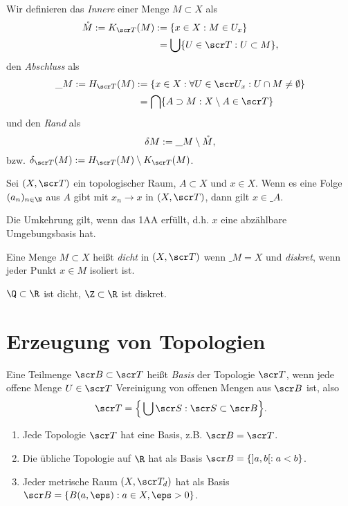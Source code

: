 \begin{df}
	Wir definieren das \emph{Innere} einer Menge $M \subset X$ als
	\begin{align*}
		\mathring M
		:= K_{\scr T}(M)
		&:= \{ x \in X : M \in U_x \} \\
		&\;= \bigcup \{ U \in \scr T : U \subset M \},
	\end{align*}
	den \emph{Abschluss} als
	\begin{align*}
		\_{M}
		:= H_{\scr T}(M)
		&:= \{ x \in X : \forall U \in \scr U_x : U \cap M \neq \emptyset \} \\
		&\;=  \bigcap \{ A \supset M : X \setminus A \in \scr T \}
	\end{align*}
	und den \emph{Rand} als
	\[
		\delta M
		:= \_ M \setminus \mathring M,
	\]
	bzw. $\delta_{\scr T}(M) := H_{\scr T}(M) \setminus K_{\scr T}(M)$.
\end{df}

\begin{st}
	Sei $(X, \scr T)$ ein topologischer Raum, $A \subset X$ und $x \in X$.
	Wenn es eine Folge $(a_n)_{n\in\N}$ aus $A$ gibt mit $x_n \to x$ in $(X, \scr T)$, dann gilt $x \in \_A$.

	Die Umkehrung gilt, wenn das 1AA erfüllt, d.h. $x$ eine abzählbare Umgebungsbasis hat.
\end{st}

\begin{df}
	Eine Menge $M \subset X$ heißt \emph{dicht} in $(X, \scr T)$ wenn $\_M = X$ und \emph{diskret}, wenn jeder Punkt $x \in M$ isoliert ist.
\end{df}

\begin{ex}
	$\Q \subset \R$ ist dicht, $\Z \subset \R$ ist diskret.
\end{ex}


\section{Erzeugung von Topologien}


\begin{df}[Basis]
	Eine Teilmenge $\scr B \subset \scr T$ heißt \emph{Basis} der Topologie $\scr T$, wenn jede offene Menge $U \in \scr T$ Vereinigung von offenen Mengen aus $\scr B$ ist, also
	\[
		\scr T = \Big\{ \bigcup \scr S : \scr S \subset \scr B \Big\}.
	\]
\end{df}

\begin{ex}
	\begin{enumerate}[1)]
		\item
			Jede Topologie $\scr T$ hat eine Basis, z.B. $\scr B = \scr T$.
		\item
			Die übliche Topologie auf $\R$ hat als Basis $\scr B = \{ ]a,b[ : a < b \}$.
		\item
			Jeder metrische Raum $(X, \scr T_d)$ hat als Basis $\scr B = \{ B(a, \eps) : a \in X, \eps > 0 \}$.
	\end{enumerate}
\end{ex}

